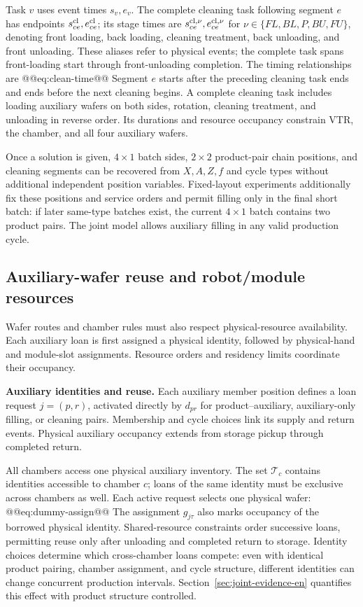 Task $v$ uses event times $s_v,e_v$. The complete cleaning task following segment $e$ has endpoints $s^{\rm cl}_{ce},e^{\rm cl}_{ce}$; its stage times are $s^{\rm cl,\nu}_{ce},e^{\rm cl,\nu}_{ce}$ for $\nu\in\{FL,BL,P,BU,FU\}$, denoting front loading, back loading, cleaning treatment, back unloading, and front unloading. These aliases refer to physical events; the complete task spans front-loading start through front-unloading completion. The timing relationships are
@@eq:clean-time@@
Segment $e$ starts after the preceding cleaning task ends and ends before the next cleaning begins. A complete cleaning task includes loading auxiliary wafers on both sides, rotation, cleaning treatment, and unloading in reverse order. Its durations and resource occupancy constrain VTR, the chamber, and all four auxiliary wafers.

Once a solution is given, $4\times1$ batch sides, $2\times2$ product-pair chain positions, and cleaning segments can be recovered from $X,A,Z,f$ and cycle types without additional independent position variables. Fixed-layout experiments additionally fix these positions and service orders and permit filling only in the final short batch: if later same-type batches exist, the current $4\times1$ batch contains two product pairs. The joint model allows auxiliary filling in any valid production cycle.

\subsection{Auxiliary-wafer reuse and robot/module resources}
\label{sec:model-resource-en}

Wafer routes and chamber rules must also respect physical-resource availability. Each auxiliary loan is first assigned a physical identity, followed by physical-hand and module-slot assignments. Resource orders and residency limits coordinate their occupancy.

\noindent\textbf{Auxiliary identities and reuse.}
Each auxiliary member position defines a loan request $j=(p,r)$, activated directly by $d_{pr}$ for product--auxiliary, auxiliary-only filling, or cleaning pairs. Membership and cycle choices link its supply and return events. Physical auxiliary occupancy extends from storage pickup through completed return.

All chambers access one physical auxiliary inventory. The set $\mathcal T_c$ contains identities accessible to chamber $c$; loans of the same identity must be exclusive across chambers as well. Each active request selects one physical wafer:
@@eq:dummy-assign@@
The assignment $g_{j\tau}$ also marks occupancy of the borrowed physical identity. Shared-resource constraints order successive loans, permitting reuse only after unloading and completed return to storage. Identity choices determine which cross-chamber loans compete: even with identical product pairing, chamber assignment, and cycle structure, different identities can change concurrent production intervals. Section~\ref{sec:joint-evidence-en} quantifies this effect with product structure controlled.

